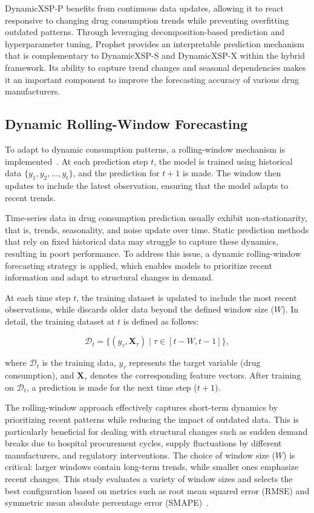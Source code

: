 \documentclass[12pt]{article}
\begin{document}
DynamicXSP-P benefits from continuous data updates, allowing it to react responsive to changing drug consumption trends while preventing overfitting outdated patterns. Through leveraging decomposition-based prediction and hyperparameter tuning, Prophet provides an interpretable prediction mechanism that is complementary to DynamicXSP-S and DynamicXSP-X within the hybrid framework. Its ability to capture trend changes and seasonal dependencies makes it an important component to improve the forecasting accuracy of various drug manufacturers.


\subsection{Dynamic Rolling-Window Forecasting}
To adapt to dynamic consumption patterns, a rolling-window mechanism is implemented~\cite{liu2020}. At each prediction step $t$, the model is trained using historical data $\{y_1, y_2, \ldots, y_t\}$, and the prediction for $t+1$ is made. The window then updates to include the latest observation, ensuring that the model adapts to recent trends.

Time-series data in drug consumption prediction usually exhibit non-stationarity, that is, trends, seasonality, and noise update over time. Static prediction methods that rely on fixed historical data may struggle to capture these dynamics, resulting in poort performance. To address this issue, a dynamic rolling-window forecasting strategy is applied, which enables models to prioritize recent information and adapt to structural changes in demand.

At each time step \(t\), the training dataset is updated to include the most recent observations, while discards older data beyond the defined window size (\(W\)). In detail, the training dataset at \(t\) is defined as follows:

\[
\mathcal{D}_{t} = \{(y_{\tau}, \mathbf{X}_{\tau}) \mid \tau \in [t - W, t-1]\},
\]

where \(\mathcal{D}_{t}\) is the training data, \(y_{\tau}\) represents the target variable (drug consumption), and \(\mathbf{X}_{\tau}\)  denotes the corresponding feature vectors. After training on \(\mathcal{D}_{t}\), a prediction is made for the next time step (\(t+1\)).

The rolling-window approach effectively captures short-term dynamics by prioritizing recent patterns while reducing the impact of outdated data. This is particularly beneficial for dealing with structural changes such as sudden demand breaks due to hospital procurement cycles, supply fluctuations by different manufacturers, and regulatory interventions. The choice of window size (\(W\)) is critical: larger windows contain long-term trends, while smaller ones emphasize recent changes. This study evaluates a variety of window sizes and selects the best configuration based on metrics such as root mean squared error (RMSE) and symmetric mean absolute percentage error (SMAPE)~\cite{hyndman2018}.
\end{document}
